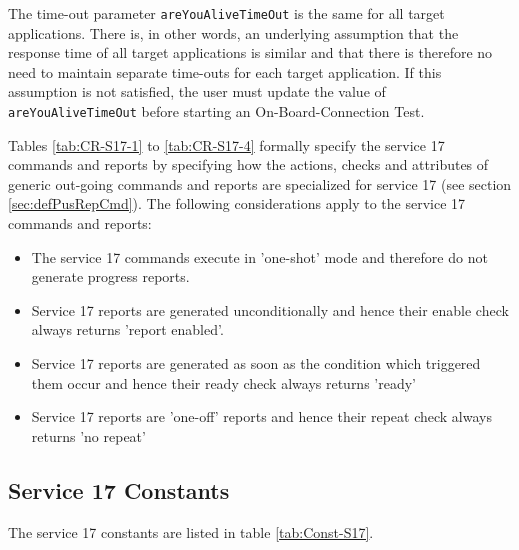 \documentclass{pnp_article}
\begin{document}
The time-out parameter \texttt{areYouAliveTimeOut} is the same for all target applications. There is, in other words, an underlying assumption that the response time of all target applications is similar and that there is therefore no need to maintain separate time-outs for each target application. If this assumption is not satisfied, the user must update the value of \texttt{areYouAliveTimeOut} before starting an On-Board-Connection Test.

Tables \ref{tab:CR-S17-1} to \ref{tab:CR-S17-4} formally specify the service 17 commands and reports by specifying how the actions, checks and attributes of generic out-going commands and reports are specialized for service 17 (see section \ref{sec:defPusRepCmd}). The following considerations apply to the service 17 commands and reports:

\begin{itemize}
\item The service 17 commands execute in 'one-shot' mode and therefore do not generate progress reports.
\item Service 17 reports are generated unconditionally and hence their enable check always returns 'report enabled'.
\item Service 17 reports are generated as soon as the condition which triggered them occur and hence their ready check always returns 'ready'
\item Service 17 reports are 'one-off' reports and hence their repeat check always returns 'no repeat'
\end{itemize}

\newpage


\newpage
{}



\newpage
\subsection{Service 17 Constants}\label{sec:serv17Const}
The service 17 constants are listed in table \ref{tab:Const-S17}. 

\end{document}
